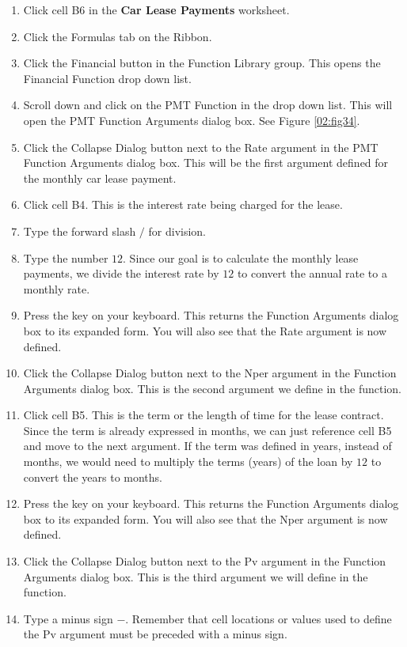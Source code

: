 \begin{enumerate}
	\item Click cell \textsf{B6} in the \textbf{Car Lease Payments} worksheet.
	\item Click the Formulas tab on the Ribbon.
	\item Click the Financial button in the Function Library group. This opens the Financial Function drop down list.
	\item Scroll down and click on the PMT Function in the drop down list. This will open the PMT Function Arguments dialog box. See Figure \ref{02:fig34}.
	\item Click the Collapse Dialog button next to the Rate argument in the PMT Function Arguments dialog box. This will be the first argument defined for the monthly car lease payment.
	\item Click cell \textsf{B4}. This is the interest rate being charged for the lease.
	\item Type the forward slash $ / $ for division.
	\item Type the number $ 12 $. Since our goal is to calculate the monthly lease payments, we divide the interest rate by $ 12 $ to convert the annual rate to a monthly rate.
	\item Press the  key on your keyboard. This returns the Function Arguments dialog box to its expanded form. You will also see that the Rate argument is now defined.
	\item Click the Collapse Dialog button next to the Nper argument in the Function Arguments dialog box. This is the second argument we define in the function.
	\item Click cell \textsf{B5}. This is the term or the length of time for the lease contract. Since the term is already expressed in months, we can just reference cell \textsf{B5} and move to the next argument. If the term was defined in years, instead of months, we would need to multiply the terms (years) of the loan by $ 12 $ to convert the years to months.
	\item Press the  key on your keyboard. This returns the Function Arguments dialog box to its expanded form. You will also see that the Nper argument is now defined.
	\item Click the Collapse Dialog button next to the Pv argument in the Function Arguments dialog box. This is the third argument we will define in the function.
	\item Type a minus sign $ - $. Remember that cell locations or values used to define the Pv argument must be preceded with a minus sign.

\end{enumerate}
